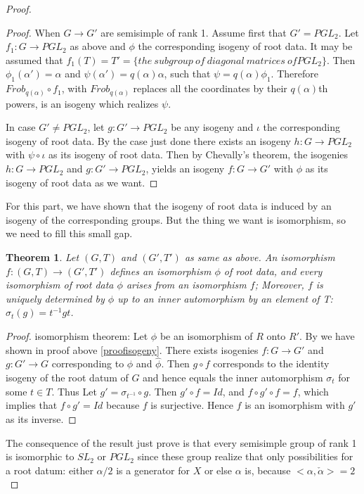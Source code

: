 \documentclass[12pt,a4paper,english]{article}
\theoremstyle{plain}
\newtheorem{thm}{Theorem}[section]
\theoremstyle{definition}
\begin{document}
\begin{proof}
\begin{proof}
When $G\rightarrow G'$ are semisimple of rank 1. Assume first that $G'=PGL_{2}$. Let $f_{1}:G\rightarrow PGL_{2}$ as above and $\phi$ the corresponding isogeny of root data. It may be assumed that $f_{1}(T)=T'=\{the\ subgroup\ of\ diagonal\ matrices\ of PGL_{2}\}$. Then $\phi_{1}(\alpha')=\alpha$ and $\psi(\alpha')=q(\alpha)\alpha$, such that $\psi=q(\alpha)\phi_{1}$. Therefore $Frob_{q(\alpha)}\circ f_{1}$, with $Frob_{q(\alpha)}$ replaces all the coordinates by their $q(\alpha)$th powers, is an isogeny which realizes $\psi$.

In case $G'\not=PGL_{2}$, let $g:G'\rightarrow PGL_{2}$ be any isogeny and $\iota$ the corresponding isogeny of root data. By the case just done there exists an isogeny $h: G\rightarrow PGL_{2}$ with $\psi\circ\iota$ as its isogeny of root data. Then by Chevally's theorem, the isogenies $h: G\rightarrow PGL_{2}$ and $g:G'\rightarrow PGL_{2}$, yields an isogeny $f:G\rightarrow G'$ with $\phi$ as its isogeny of root data as we want.

\end{proof}

For this part, we have shown that the isogeny of root data is induced by an isogeny of the corresponding groups. But the thing we want is isomorphism, so we need to fill this small gap.
\begin{thm}
Let $(G,T)$ and $(G',T')$ as same as above. An isomorphism $f:(G,T)\rightarrow (G',T')$ defines an isomorphism $\phi$ of root data, and every isomorphism of root data $\phi$ arises from an isomorphism $f$; Moreover, $f$ is uniquely determined by $\phi$ up to an inner automorphism by an element of T: $\sigma_{t}(g)=t^{-1}gt$.
\end{thm}
\begin{proof}
isomorphism theorem: Let $\phi$ be an isomorphism of $R$ onto $R'$. By we have shown in proof above \ref{proofisogeny}. There exists isogenies $f:G\rightarrow G'$ and $g:G'\rightarrow G$ corresponding to $\phi$ and $\hat{\phi}$. Then $g\circ f$ corresponds to the identity isogeny of the root datum of $G$ and hence equals the inner automorphism $\sigma_{t}$ for some $t\in T$. Thus Let $g'=\sigma_{t^{-1}}\circ g$. Then $g'\circ f=Id$, and $f\circ g'\circ f=f$, which implies that $f\circ g'=Id$ because $f$ is surjective. Hence $f$ is an isomorphism with $g'$ as its inverse.
\end{proof}




The consequence of the result just prove is that every semisimple group of rank 1 is isomorphic to $SL_{2}$ or $PGL_{2}$ since these group realize that only possibilities for a root datum: either $\alpha/2$ is a generator for $X$ or else $\alpha$ is, because $<\alpha,\check{\alpha}>=2$
\end{proof}
\end{document}
